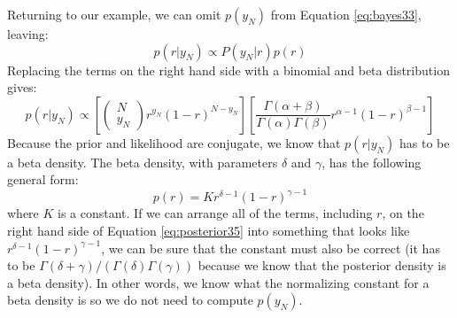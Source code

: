 Returning to our example, we can omit $p(y_N)$ from Equation \ref{eq:bayes33}, leaving:
\begin{equation*}
p(r|y_N) \propto P(y_{N}|r) p(r)
\end{equation*}
Replacing the terms on the right hand side with a binomial and beta distribution
gives:
\begin{equation}
p(r|y_N) \propto \left[
\begin{pmatrix} N \\ y_N \end{pmatrix} r^{y_N} (1 - r)^{N - y_N}
\right]
\left[
\frac{\Gamma(\alpha + \beta)}{\Gamma(\alpha)\Gamma(\beta)}
r^{\alpha - 1} (1 - r)^{\beta - 1}
\right]
\label{eq:posterior35}
\end{equation}
Because the prior and likelihood are conjugate, we know that $p(r|y_N)$ has to be a
beta density.
The beta density, with parameters $\delta$ and $\gamma$, has the following general
form:
\begin{equation*}
p(r) = K r^{\delta - 1} (1 - r)^{\gamma - 1}
\end{equation*}
where $K$ is a constant. If we can arrange all of the terms, including $r$, on the right
hand side of Equation \eqref{eq:posterior35}
into something that looks like $r^{\delta - 1} (1 - r)^{\gamma - 1}$,
we can be
sure that the constant must also be correct (it has to be
$\Gamma(\delta + \gamma)/(\Gamma(\delta) \Gamma(\gamma))$ because
we know that the posterior density is a beta density). In other words, we know what
the normalizing constant for a beta density is so we do not need to compute $p(y_N)$.

